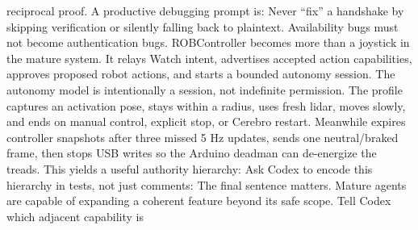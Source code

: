 {}reciprocal proof.\markdownRendererParagraphSeparator
{}A productive debugging prompt is:\markdownRendererInterblockSeparator
{}\markdownRendererInterblockSeparator
{}Never “fix” a handshake by skipping verification or silently falling back to\markdownRendererSoftLineBreak
{}plaintext. Availability bugs must not become authentication bugs.\markdownRendererInterblockSeparator
{}\markdownRendererThematicBreak{}\markdownRendererInterblockSeparator
{}
\markdownRendererSectionEnd 
\markdownRendererSectionEnd \markdownRendererSectionBegin
{}\markdownRendererInterblockSeparator
{}ROBController becomes more than a joystick in the mature system. It relays\markdownRendererSoftLineBreak
{}Watch intent, advertises accepted action capabilities, approves proposed robot\markdownRendererSoftLineBreak
{}actions, and starts a bounded autonomy session.\markdownRendererParagraphSeparator
{}The autonomy model is intentionally a session, not indefinite permission. The\markdownRendererSoftLineBreak
{} profile captures an activation pose, stays within a radius, uses\markdownRendererSoftLineBreak
{}fresh lidar, moves slowly, and ends on manual control, explicit stop, or\markdownRendererSoftLineBreak
{}Cerebro restart. Meanwhile  expires controller snapshots after\markdownRendererSoftLineBreak
{}three missed 5 Hz updates, sends one neutral/braked frame, then stops USB\markdownRendererSoftLineBreak
{}writes so the Arduino deadman can de-energize the treads.\markdownRendererParagraphSeparator
{}This yields a useful authority hierarchy:\markdownRendererInterblockSeparator
{}\markdownRendererInterblockSeparator
{}Ask Codex to encode this hierarchy in tests, not just comments:\markdownRendererInterblockSeparator
{}\markdownRendererInterblockSeparator
{}The final sentence matters. Mature agents are capable of expanding a coherent\markdownRendererSoftLineBreak
{}feature beyond its safe scope. Tell Codex which adjacent capability is\markdownRendererSoftLineBreak
